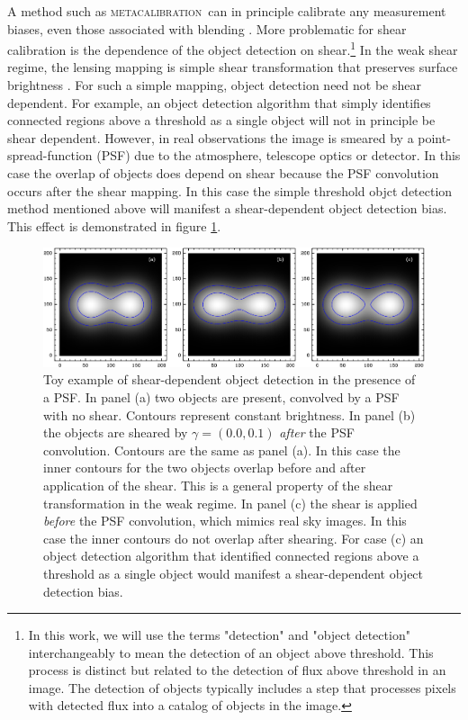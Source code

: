 \documentclass[fleqn,useAMS,usenatbib]{mnras}
\newcommand{\mcal}{\textsc{metacalibration}}
\begin{document}
A method such as \mcal\ can in principle calibrate any measurement biases, even
those associated with blending \citep[e.g.,][]{DawsonBlending2016}. More
problematic for shear calibration is the dependence of the object detection on
shear.\footnote{In this work, we will use the terms "detection" and "object detection"
interchangeably to mean the detection of an object above threshold. This process
is distinct but related to the detection of flux above threshold in an image.
The detection of objects typically includes a step that processes pixels with
detected flux into a catalog of objects in the image.} In the weak shear regime, the lensing mapping is simple shear
transformation that preserves surface brightness \citep{SchneiderBook92}. For
such a simple mapping, object detection need not be shear dependent. For example, an
object detection algorithm that simply identifies connected regions above a threshold
as a single object will not in principle be shear dependent. However, in real
observations the image is smeared by a point-spread-function (PSF) due to the
atmosphere, telescope optics or detector. In this case the overlap of objects
does depend on shear because the PSF convolution occurs after the shear mapping.
In this case the simple threshold objct detection method mentioned above will manifest
a shear-dependent object detection bias. This effect is demonstrated in figure
\ref{fig:toy}.


\begin{figure}
  \includegraphics[width=\textwidth]{figures/toy.png}

  \caption{ Toy example of shear-dependent object detection in the presence of a
  PSF.  In panel (a) two objects are present, convolved by a PSF with no
  shear.  Contours represent constant brightness.  In panel (b) the objects
  are sheared by $\gamma = (0.0, 0.1)$ {\em after} the PSF convolution.
  Contours are the same as panel (a).  In this case the inner contours for
  the two objects overlap before and after application of the shear.  This is
  a general property of the shear transformation in the weak regime. In panel
  (c) the shear is applied {\em before} the PSF convolution, which mimics real
  sky images. In this case the inner contours do not overlap after shearing.
  For case (c) an object detection algorithm that identified connected regions above
  a threshold as a single object would manifest a shear-dependent object detection
  bias.  \label{fig:toy} }

\end{figure}
\end{document}
